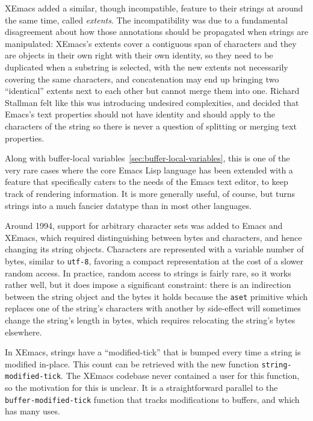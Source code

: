 \documentclass[format=acmsmall, review]{acmart}
\newcommand \Elisp {Emacs Lisp}
\begin{document}
XEmacs added a similar, though incompatible, feature to their strings at
around the same time, called \emph{extents}.  The incompatibility was due to
a fundamental disagreement about how those annotations should be propagated
when strings are manipulated: XEmacs's extents cover a contiguous span of
characters and they are objects in their own right with their own identity,
so they need to be duplicated when a substring is selected, with the new
extents not necessarily covering the same characters, and concatenation may
end up bringing two ``identical'' extents next to each other but cannot
merge them into one.  Richard Stallman felt like this was introducing
undesired complexities, and decided that Emacs's text properties should not
have identity and should apply to the characters of the string so there is
never a question of splitting or merging text properties.

Along with buffer-local variables~\ref{sec:buffer-local-variables}, this is one of
the very rare cases where the core \Elisp{} language has been extended with
a feature that specifically caters to the needs of the Emacs text editor, to
keep track of rendering information.  It is more generally useful, of
course, but turns strings into a much fancier datatype than in most
other languages.

Around 1994, support for arbitrary character sets was added to Emacs and
XEmacs, which required distinguishing between bytes and characters, and
hence changing its string objects.  Characters are represented with
a variable number of bytes, similar to \texttt{utf-8}, favoring a compact
representation at the cost of a slower random access.  In practice, random
access to strings is fairly rare, so it works rather well, but it does
impose a significant constraint: there is an indirection between the string
object and the bytes it holds because the \texttt{aset} primitive which
replaces one of the string's characters with another by side-effect will
sometimes change the string's length in bytes, which requires relocating
the string's bytes elsewhere.

In XEmacs, strings have a ``modified-tick'' that is bumped every time
a string is modified in-place.  This count can be retrieved with the
new function \texttt{string-modified-tick}.  The XEmacs codebase never
contained a user for this function, so the motivation for this is
unclear.  It is a straightforward parallel to the
\texttt{buffer-modified-tick} function that tracks modifications to
buffers, and which has many uses.
\end{document}
